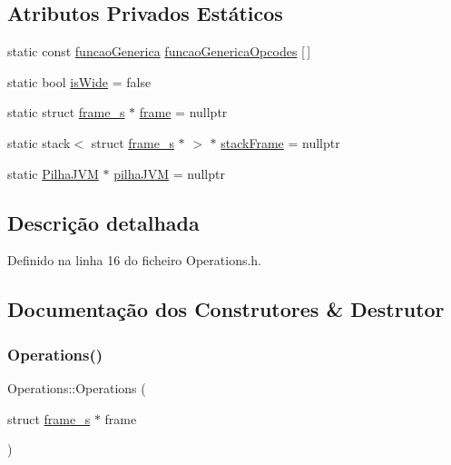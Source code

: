 \subsection*{Atributos Privados Estáticos}
\begin{DoxyCompactItemize}
\item 
static const \hyperlink{Operations_8h_a41b02f2392b85fc1d04e0d8e11c43398}{funcao\+Generica} \hyperlink{classOperations_a7cb32c09e40f348cabf0b7af374ad278}{funcao\+Generica\+Opcodes} \mbox{[}$\,$\mbox{]}
\item 
static bool \hyperlink{classOperations_a672ba6cc2178cbc5b0a434b08de4c608}{is\+Wide} = false
\item 
static struct \hyperlink{structframe__s}{frame\+\_\+s} $\ast$ \hyperlink{classOperations_a0dc7b3710786c9cbd14801ac3e5d34b2}{frame} = nullptr
\item 
static stack$<$ struct \hyperlink{structframe__s}{frame\+\_\+s} $\ast$ $>$ $\ast$ \hyperlink{classOperations_ae813b6fad395a04f6cd8e0c355dc056d}{stack\+Frame} = nullptr
\item 
static \hyperlink{classPilhaJVM}{Pilha\+J\+VM} $\ast$ \hyperlink{classOperations_a1a7c399bf01fabfc223a3f84f7fcace0}{pilha\+J\+VM} = nullptr
\end{DoxyCompactItemize}


\subsection{Descrição detalhada}


Definido na linha 16 do ficheiro Operations.\+h.



\subsection{Documentação dos Construtores \& Destrutor}
\mbox{\label{classOperations_a302329a641fa78f54d1f1f307736b870}} 
\subsubsection{\texorpdfstring{Operations()}{Operations()}}
{\footnotesize\ttfamily Operations\+::\+Operations (\begin{DoxyParamCaption}\item[{struct \hyperlink{structframe__s}{frame\+\_\+s} $\ast$}]{frame }\end{DoxyParamCaption})}



